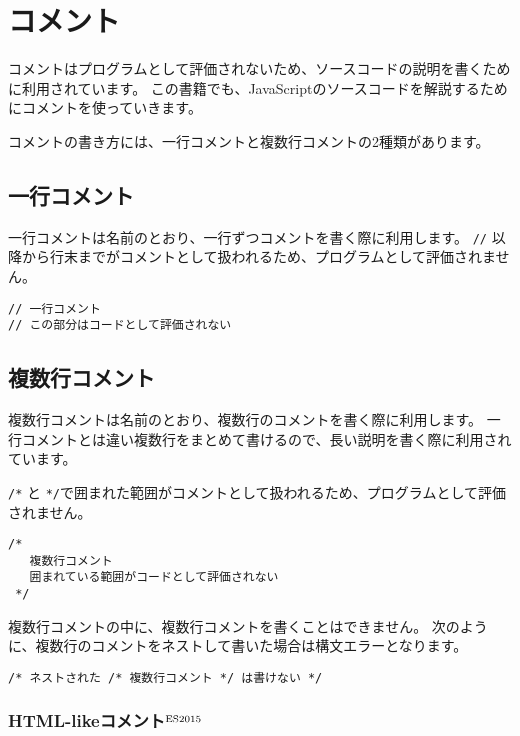 \hypertarget{comment}{%
\chapter{コメント}\label{comment}}
\thispagestyle{frontheadings}

コメントはプログラムとして評価されないため、ソースコードの説明を書くために利用されています。
この書籍でも、JavaScriptのソースコードを解説するためにコメントを使っていきます。

コメントの書き方には、一行コメントと複数行コメントの2種類があります。

\hypertarget{single-line-comment}{%
\section{一行コメント}\label{single-line-comment}}

一行コメントは名前のとおり、一行ずつコメントを書く際に利用します。
\texttt{//}
以降から行末までがコメントとして扱われるため、プログラムとして評価されません。

\begin{lstlisting}
// 一行コメント
// この部分はコードとして評価されない
\end{lstlisting}

\hypertarget{multi-line-comment}{%
\section{複数行コメント}\label{multi-line-comment}}

複数行コメントは名前のとおり、複数行のコメントを書く際に利用します。
一行コメントとは違い複数行をまとめて書けるので、長い説明を書く際に利用されています。

\texttt{/*} と
\texttt{*/}で囲まれた範囲がコメントとして扱われるため、プログラムとして評価されません。

\begin{lstlisting}
/* 
   複数行コメント
   囲まれている範囲がコードとして評価されない
 */
\end{lstlisting}

複数行コメントの中に、複数行コメントを書くことはできません。
次のように、複数行のコメントをネストして書いた場合は構文エラーとなります。

\begin{lstlisting}
/* ネストされた /* 複数行コメント */ は書けない */
\end{lstlisting}

\hypertarget{html-like-comment}{%
\subsection{HTML-likeコメント{$^{\rm ES2015}$}}\label{html-like-comment}}

